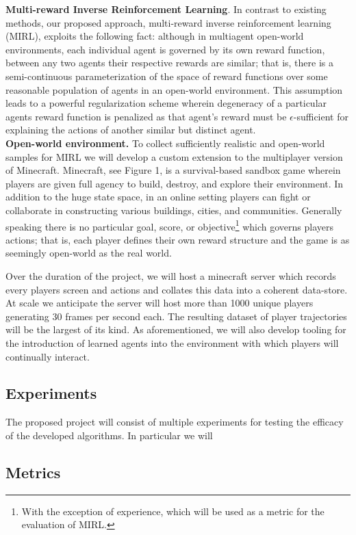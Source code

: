 \documentclass[11pt]{article}
\begin{document}
\noindent\textbf{Multi-reward Inverse Reinforcement Learning}. In contrast to existing methods, our proposed approach, multi-reward inverse reinforcement learning (MIRL), exploits the following fact: although in multiagent open-world environments, each individual agent is governed by its own reward function, between any two agents their respective rewards are similar; that is, there is a semi-continuous parameterization of the space of reward functions over some reasonable population of agents in an open-world environment. This assumption leads to a powerful regularization scheme wherein degeneracy of a particular agents reward function is penalized as that agent's reward must be $\epsilon$-sufficient for explaining the actions of another similar but distinct agent. \\

\noindent \textbf{Open-world environment.} To collect sufficiently realistic and open-world samples for MIRL we will develop a custom extension to the multiplayer version of Minecraft. Minecraft, see Figure 1, is a survival-based sandbox game wherein players are given full agency to build, destroy, and explore their environment. In addition to the huge state space, in an online setting players can fight or collaborate in constructing various buildings, cities, and communities. Generally speaking there is no particular goal, score, or objective\footnote{With the exception of experience, which will be used as a metric for  the evaluation of MIRL.} which governs players actions; that is, each player defines their own reward structure and the game is as seemingly open-world as the real world.

Over the duration of the project, we will host a minecraft server which records every players screen and actions and collates this data into a coherent data-store. At scale we anticipate the server will host more than 1000 unique players generating 30 frames per second each. The resulting dataset of player trajectories will be the largest of its kind. As aforementioned, we will also develop tooling for the introduction of learned agents into the environment with which players will continually interact.





\subsection{Experiments}

The proposed project will consist of multiple experiments for testing the efficacy of the developed algorithms. In particular we will 

\subsection{Metrics}







\end{document}
